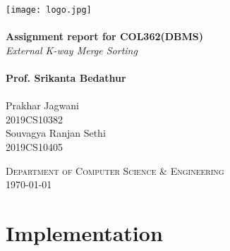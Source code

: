 \documentclass{article}
\begin{document}
\begin{titlepage}
    \begin{center}
        \texttt{[image: logo.jpg]}~\\[1.6cm]
    
        \HRule \\[0.4cm]
        { \LARGE 
          \textbf{Assignment report for COL362(DBMS)}\\[0.4cm]
          \emph{External K-way Merge Sorting}\\[0.4cm]
        }
        \HRule \\[1.5cm]
        
        
        { \large
            \textbf{Prof. Srikanta Bedathur}\\ \\[0.1cm]
            \vspace{20pt}
            Prakhar Jagwani \\ 2019CS10382 \\
            Souvagya Ranjan Sethi \\2019CS10405
        }
        
        \vfill
        
        \textsc{\large Department of Computer Science \& Engineering}\\[0.4cm]
        {\large \today}
         
    \end{center}
\end{titlepage}

\section{Implementation}
\end{document}
